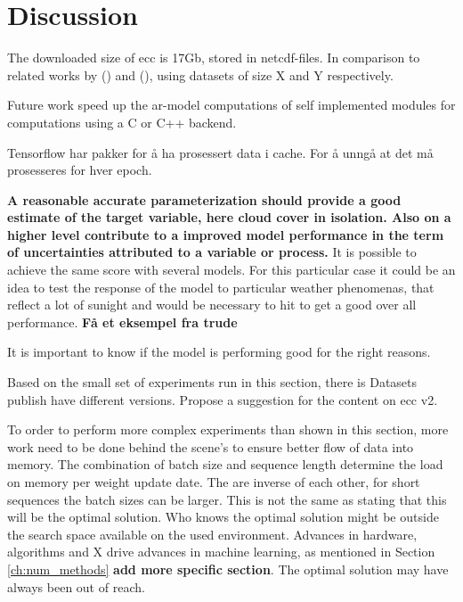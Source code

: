 \chapter{Discussion}
The downloaded size of \acrshort{ecc} is 17Gb, stored in \acrshort{netcdf}-files. 
In comparison to related works by \citeauthor{precip_nowcasting} (\citeyear{precip_nowcasting}) and \citeauthor{SunAirLSTM} (\citeyear{SunAirLSTM}), using datasets of size X and Y respectively.

Future work speed up the \acrshort{ar}-model computations of self implemented modules for computations using  a C or C++ backend.

Tensorflow har pakker for å ha prosessert data i cache. For å unngå at det må prosesseres for hver epoch. 



\textbf{A reasonable accurate parameterization should provide a good estimate of the target variable, here cloud cover in isolation. Also on a higher level contribute to a improved model performance in the term of uncertainties attributed to a variable or process.}  It is possible to achieve the same score with several  models. For this particular case it could be an idea to test the response of the model to particular weather phenomenas, that reflect a lot of sunight and would be necessary to hit to get a good over all performance. \textbf{Få et eksempel fra trude} 

It is important to know if the model is performing good for the right reasons.

Based on the small set of experiments run in this section, there is 
Datasets publish have different versions. Propose a suggestion for the content on \acrshort{ecc} v2.

To order to perform more complex experiments than shown in this section, more work need to be done behind the scene's to ensure better flow of data into memory. The combination of batch size and sequence length determine the load on memory per weight update date. The are inverse of each other, for short sequences the batch sizes can be larger. This is not the same as stating that this will be the optimal solution. Who knows the optimal solution might be outside the search space available on the used environment. Advances in hardware, algorithms and X drive advances in machine learning, as mentioned in Section \ref{ch:num_methods} \textbf{add more specific section}. The optimal solution may have always been out of reach. 

